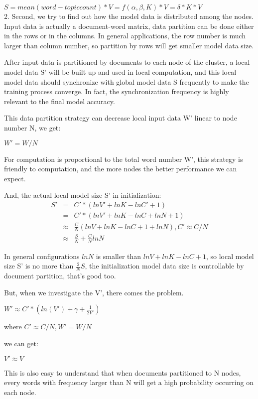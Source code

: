 $ S=mean(word-topic count)*V = f(\alpha, \beta, K)*V = \delta*K*V$ \\

2. Second, we try to find out how the model data is distributed among the nodes. \\

Input data is actually a document-word matrix, data partition can be done either in the rows or in the columns. In general applications, the row number is much larger than column number, so partition by rows will get smaller model data size. 

After input data is partitioned by documents to each node of the cluster, a local model data S' will be built up and used in local computation, and this local model data should synchronize with global model data S frequently to make the training process converge. In fact, the synchronization frequency is highly relevant to the final model accuracy.

This data partition strategy can decrease local input data W' linear to node number N, we get:

$W' = W / N$

For computation is proportional to the total word number W', this strategy is friendly to computation, and the more nodes the better performance we can expect. 

And, the actual local model size S' in initialization:
\begin{eqnarray*}
S' &=& C' * (lnV' + lnK -lnC' +1)  \\
   &=& C' * (lnV' + lnK -lnC + lnN +1)  \\
   &\approx& \frac{C}{N}(lnV +lnK -lnC + 1 +lnN),  C' \approx C/N  \\
   &\approx& \frac{S}{N} + \frac{C}{N}lnN
\end{eqnarray*}

In general configurations $lnN$ is smaller than $lnV+lnK-lnC+1$, so local model size S' is no more than $\frac{2}{N}S$, the initialization model data size is controllable by document partition,  that's good too.

But, when we investigate the V', there comes the problem.

$W' \approx C'*(ln(V') + \gamma + \frac{1}{2V'})$

where $C' \approx C/N, W' = W/N$

we can get:

$V' \approx V$

This is also easy to understand that when documents partitioned to N nodes, every words with frequency larger than N will get a high probability occurring on each node. 

